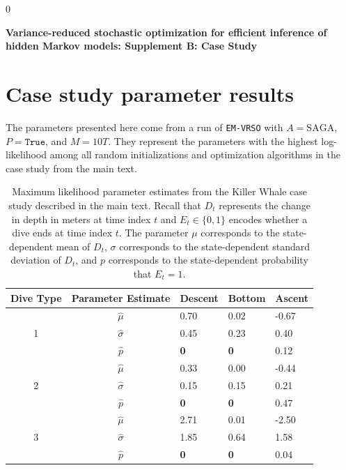 \documentclass[12pt]{article}
\newcommand{\blind}{0}
\begin{document}
\blind
{
  \bigskip
  \bigskip
  \bigskip
  \begin{center}
    {\LARGE\bf Variance-reduced stochastic optimization for efficient inference of hidden Markov models: Supplement B: Case Study}
  \end{center}
  \medskip
} \fi


\section{Case study parameter results}

The parameters presented here come from a run of \texttt{EM-VRSO} with $A = \text{SAGA}$, $P = \texttt{True}$, and $M=10T$. They represent the parameters with the highest log-likelihood among all random initializations and optimization algorithms in the case study from the main text. 

\begin{table}[H]
\centering
\begin{tabular}{c|c|lll}
\multicolumn{1}{l|}{Dive Type} & Parameter Estimate & Descent & Bottom & Ascent \\ \hline
\multirow{3}{*}{1}            & $\hat \mu$     & 0.70    & 0.02   & -0.67  \\
                              & $\hat \sigma$  & 0.45    & 0.23   & 0.40   \\
                              & $\hat p$       & \bf{0}  & \bf{0} & 0.12   \\ \hline 
\multirow{3}{*}{2}            & $\hat \mu$     & 0.33    & 0.00   & -0.44  \\
                              & $\hat \sigma$  & 0.15    & 0.15   & 0.21   \\
                              & $\hat p$       & \bf{0}  & \bf{0} & 0.47   \\ \hline
\multirow{3}{*}{3}            & $\hat \mu$     & 2.71    & 0.01   & -2.50  \\
                              & $\hat \sigma$  & 1.85    & 0.64   & 1.58   \\
                              & $\hat p$       & \bf{0}  & \bf{0} & 0.04  
\end{tabular}
\caption{Maximum likelihood parameter estimates from the Killer Whale case study described in the main text. Recall that $D_t$ represents the change in depth in meters at time index $t$ and $E_t \in \{0,1\}$ encodes whether a dive ends at time index $t$. The parameter $\mu$ corresponds to the state-dependent mean of $D_t$, $\sigma$ corresponds to the state-dependent standard deviation of $D_t$, and $p$ corresponds to the state-dependent probability that $E_t=1$.}
\end{table}
\end{document}
